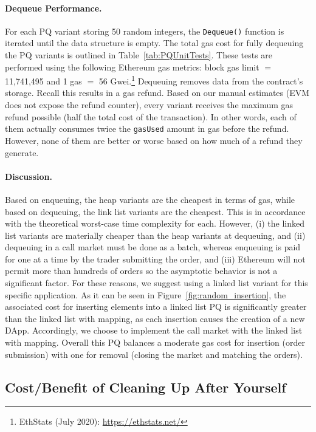 \paragraph{Dequeue Performance.} For each PQ variant storing 50 random integers, the \texttt{Dequeue()} function is iterated until the data structure is empty. The total gas cost for fully dequeuing the PQ variants is outlined in Table~\ref{tab:PQUnitTests}. These tests are performed using the following Ethereum gas metrics: block gas limit $=$11,741,495 and 1 gas $=$ 56 Gwei.\footnote{EthStats (July 2020): \url{https://ethstats.net/}} Dequeuing removes data from the contract's storage. Recall this results in a gas refund. Based on our manual estimates (EVM does not expose the refund counter), every variant receives the maximum gas refund possible (\ie half the total cost of the transaction). In other words, each of them actually consumes twice the \texttt{gasUsed} amount in gas before the refund. However, none of them are better or worse based on how much of a refund they generate.  

\paragraph{Discussion.} Based on enqueuing, the heap variants are the cheapest in terms of gas, while based on dequeuing, the link list variants are the cheapest. This is in accordance with the theoretical worst-case time complexity for each. However, (i) the linked list variants are materially cheaper than the heap variants at dequeuing, and (ii) dequeuing in a call market must be done as a batch, whereas enqueuing is paid for one at a time by the trader submitting the order, and (iii) Ethereum will not permit more than hundreds of orders so the asymptotic behavior is not a significant factor. For these reasons, we suggest using a linked list variant for this specific application. As it can be seen in Figure~\ref{fig:random_insertion}, the associated cost for inserting elements into a linked list PQ is significantly greater than the linked list with mapping, as each insertion causes the creation of a new DApp. Accordingly, we choose to implement the call market with the linked list with mapping. Overall this PQ balances a moderate gas cost for insertion (\ie order submission) with one for removal (\ie closing the market and matching the orders). 


\subsection{Cost/Benefit of Cleaning Up After Yourself}
\label{sec:gasrefund}


